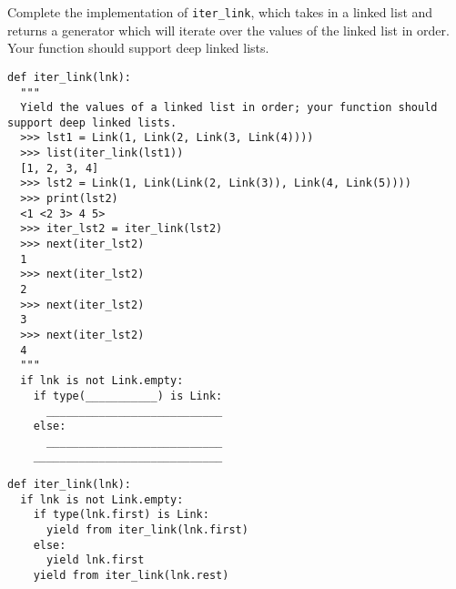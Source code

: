 \begin{blocksection}
\question Complete the implementation of \lstinline{iter_link}, which takes in a linked list and returns a generator which will iterate over the values of the linked list in order. Your function should support deep linked lists.

\begin{lstlisting}
def iter_link(lnk):
  """ 
  Yield the values of a linked list in order; your function should support deep linked lists.
  >>> lst1 = Link(1, Link(2, Link(3, Link(4))))
  >>> list(iter_link(lst1))
  [1, 2, 3, 4]
  >>> lst2 = Link(1, Link(Link(2, Link(3)), Link(4, Link(5))))
  >>> print(lst2)
  <1 <2 3> 4 5>
  >>> iter_lst2 = iter_link(lst2)
  >>> next(iter_lst2)
  1
  >>> next(iter_lst2)
  2
  >>> next(iter_lst2) 
  3
  >>> next(iter_lst2)
  4
  """
  if lnk is not Link.empty:
    if type(___________) is Link:
      ___________________________
    else:
      ___________________________
    _____________________________
\end{lstlisting}

\begin{solution}[0.7in]
\begin{lstlisting}
def iter_link(lnk):
  if lnk is not Link.empty:
    if type(lnk.first) is Link:
      yield from iter_link(lnk.first)
    else:
      yield lnk.first
    yield from iter_link(lnk.rest)
\end{lstlisting}
\end{solution}
\end{blocksection}
